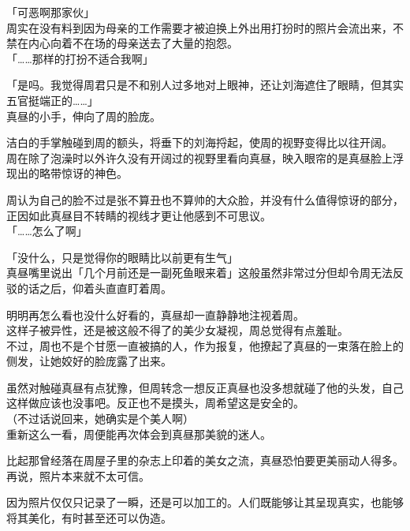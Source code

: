 「可恶啊那家伙」\\

周实在没有料到因为母亲的工作需要才被迫换上外出用打扮时的照片会流出来，不禁在内心向着不在场的母亲送去了大量的抱怨。\\

「……那样的打扮不适合我啊」

「是吗。我觉得周君只是不和别人过多地对上眼神，还让刘海遮住了眼睛，但其实五官挺端正的……」\\

真昼的小手，伸向了周的脸庞。

洁白的手掌触碰到周的额头，将垂下的刘海捋起，使周的视野变得比以往开阔。\\

周在除了泡澡时以外许久没有开阔过的视野里看向真昼，映入眼帘的是真昼脸上浮现出的略带惊讶的神色。

周认为自己的脸不过是张不算丑也不算帅的大众脸，并没有什么值得惊讶的部分，正因如此真昼目不转睛的视线才更让他感到不可思议。\\

「……怎么了啊」

「没什么，只是觉得你的眼睛比以前更有生气」\\

真昼嘴里说出「几个月前还是一副死鱼眼来着」这般虽然非常过分但却令周无法反驳的话之后，仰着头直直盯着周。

明明再怎么看也没什么好看的，真昼却一直静静地注视着周。\\

这样子被异性，还是被这般不得了的美少女凝视，周总觉得有点羞耻。\\

不过，周也不是个甘愿一直被搞的人，作为报复，他撩起了真昼的一束落在脸上的侧发，让她姣好的脸庞露了出来。

虽然对触碰真昼有点犹豫，但周转念一想反正真昼也没多想就碰了他的头发，自己这样做应该也没事吧。反正也不是摸头，周希望这是安全的。\\

（不过话说回来，她确实是个美人啊）\\

重新这么一看，周便能再次体会到真昼那美貌的迷人。

比起那曾经落在周屋子里的杂志上印着的美女之流，真昼恐怕要更美丽动人得多。\\

再说，照片本来就不太可信。

因为照片仅仅只记录了一瞬，还是可以加工的。人们既能够让其呈现真实，也能够将其美化，有时甚至还可以伪造。\\

